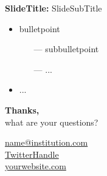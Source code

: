 \documentclass{beamer} %
\begin{document}
\begin{frame}{\textbf{SlideTitle:} SlideSubTitle}
	\begin{itemize}
	    \item bulletpoint
    	\begin{itemize}
    	    \item[---] subbulletpoint
    	    \item[---] ...
    	\end{itemize}
    	\item ...
	\end{itemize}
\end{frame}

{
    \begin{frame}[plain]		
    	\vspace{1.5cm}
    	{\color{white}\LARGE \textbf{Thanks,}\\ \vspace{.2cm} \large what are your questions?}
    		
    	\vspace{2.5cm}
    	
    	\hspace{7cm}\circled{{\color{lmu-green}\fontsize{8}{9}\faEnvelope}} \hspace{.1cm} {\footnotesize \color{white} \href{mailto:#}{name@institution.com}}\\ %
    	\hspace{7cm}\circled{{\color{lmu-green}\footnotesize\faTwitter}} \hspace{.1cm} {\footnotesize \color{white} \href{#}{TwitterHandle}}\\ %
    	\hspace{7cm}\circled{{\color{lmu-green}\footnotesize\faHome}} \hspace{.1cm} {\footnotesize \color{white} \href{#}{yourwebsite.com}}\\ %
    \end{frame}
    \addtocounter{framenumber}{-1}
}

\begin{frame}
  
    {\footnotesize
      
    }
\end{frame}
\end{document}

